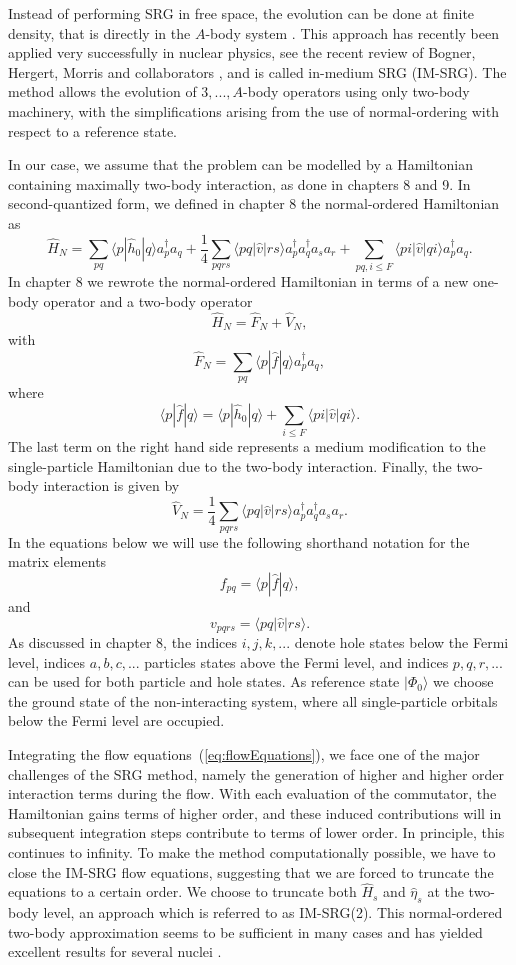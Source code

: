 Instead of performing SRG in free space, the evolution can be done at
finite density, that is directly in the $A$-body system
\cite{Kehrein:2006kx}. This approach has recently been applied very
successfully in nuclear physics, see the recent review of Bogner, Hergert, Morris and collaborators 
\cite{Hergert:2016jk,Hergert:2016ng,Morris:2016xp},
and is called in-medium SRG (IM-SRG). The method allows the evolution
of $3,...,A$-body operators using only two-body machinery, with the
simplifications arising from the use of normal-ordering with respect
to a reference state.

In our case, we assume that the problem can be modelled by a
Hamiltonian containing maximally two-body interaction, as done in chapters 8 and 9. In
second-quantized form, we defined in chapter 8 the normal-ordered Hamiltonian as
\[
\hat{H}_N = \sum_{pq} \langle p|\hat{h}_0|q\rangle a^\dagger_p
a_q+\frac{1}{4} \sum_{pqrs} \langle pq|\hat{v}|rs\rangle a^\dagger_p a^\dagger_q a_s a_r+\sum_{pq,i\le F}
\langle pi|\hat{v}|qi\rangle a^\dagger_p a_q.
\]
In chapter 8 we rewrote the normal-ordered Hamiltonian 
in terms of a new one-body operator and a two-body operator
\[
\hat{H}_N=\hat{F}_N+\hat{V}_N,
\]
with
\[
\hat{F}_N=\sum_{pq} \langle p|\hat{f}|q\rangle a^\dagger_pa_q,
\]
where
\[
\langle p|\hat{f}|q\rangle= \langle p|\hat{h}_0|q\rangle +\sum_{i\le F}
\langle pi|\hat{v}|qi\rangle.
\]
The last term on the right hand side represents a medium modification
to the single-particle Hamiltonian due to the two-body interaction.
Finally, the two-body interaction is given by
\[
\hat{V}_N = \frac{1}{4} \sum_{pqrs} \langle pq|\hat{v}|rs\rangle a^\dagger_p a^\dagger_q a_s a_r.
\]
In the equations below we will use the following shorthand notation for the matrix elements
\[
f_{pq}=\langle p|\hat{f}|q\rangle,
\]
and 
\[
v_{pqrs}= \langle pq|\hat{v}|rs\rangle.
\]
As discussed in chapter 8, the indices $i,j,k,...$
denote hole states below the Fermi level, indices $a,b,c,...$
particles states above the Fermi level, and indices $ p,q,r,...$ can
be used for both particle and hole states. As reference state
$|\Phi_0\rangle$ we choose the ground state of the non-interacting
system, where all single-particle orbitals below the Fermi level are
occupied.

Integrating the flow equations~(\ref{eq:flowEquations}), we face one
of the major challenges of the SRG method, namely the generation of
higher and higher order interaction terms during the flow. With each
evaluation of the commutator, the Hamiltonian gains terms of higher
order, and these induced contributions will in subsequent integration
steps contribute to terms of lower order. In principle, this continues
to infinity. 
To make the method computationally possible, we have to
close the IM-SRG flow equations, suggesting that we are forced to
truncate the equations to a certain order. We choose to truncate both
$\hat{H}_s$ and $\hat{\eta}_s$ at the two-body level, an approach
which is referred to as IM-SRG(2).  This normal-ordered two-body
approximation seems to be sufficient in many cases and has yielded
excellent results for several nuclei
\cite{Tsukiyama:2011uq,Tsukiyama:2012fk,Hergert:2016jk,Hergert:2016ng}.

